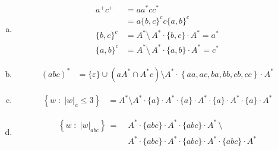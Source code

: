 \documentclass{scrartcl}
\begin{document}
\begin{enumerate}[(a)]
  \item \begin{align*}
    a^+c^+ &= aa^*cc^*\\
          &= a\{b,c\}^c c\{a,b\}^c\\
        \{b,c\}^c  &= A^*\setminus \, A^* \cdot \{b,c\} \cdot A^* = a^*\\
        \{a,b\}^c  &= A^*\setminus \, A^* \cdot \{a,b\} \cdot A^* = c^*
  \end{align*}
  \item \begin{align*}
    (abc)^* &= \{\varepsilon\} \cup \left( aA^* \cap A^*c \right) \setminus A^* \cdot \left\{ aa, ac, ba, bb, cb, cc\right\} \cdot A^*
  \end{align*}
  \item \begin{align*}
    \left\{w\;:\;|w|_a \leq 3 \right\} &= A^* \setminus A^*\cdot\{a\}\cdot A^*\cdot\{a\}\cdot A^*\cdot\{a\}\cdot A^*\cdot\{a\}\cdot A^*
  \end{align*}
  \item \begin{align*}
    \left\{w\;:\;|w|_{abc}\right\}\,=\;&A^* \cdot \{abc\} \cdot A^* \cdot \{abc\} \cdot A^*\,\setminus\\
    & A^* \cdot \{abc\} \cdot A^* \cdot \{abc\} \cdot A^* \cdot \{abc\}  \cdot A^*
  \end{align*}
\end{enumerate}
\end{document}
